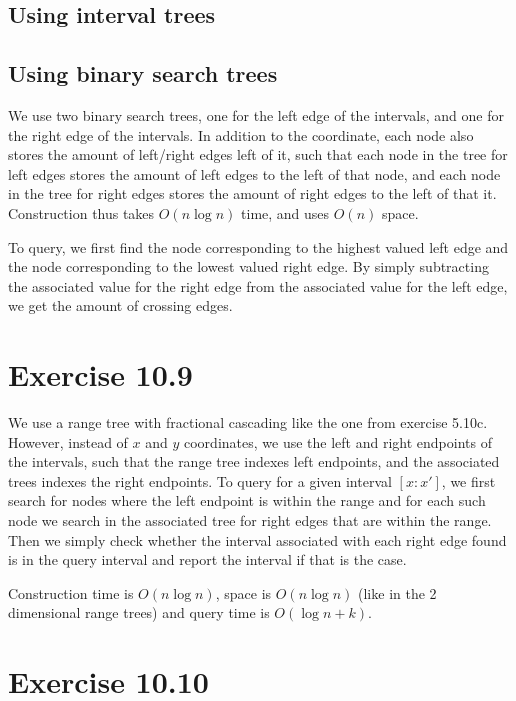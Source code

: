 \documentclass[11pt,a4paper]{article}
\begin{document}
\subsection{Using interval trees}


\subsection{Using binary search trees}

We use two binary search trees, one for the left edge of the
intervals, and one for the right edge of the intervals. In addition to
the coordinate, each node also stores the amount of left/right edges
left of it, such that each node in the tree for left edges stores the
amount of left edges to the left of that node, and each node in the
tree for right edges stores the amount of right edges to the left of
that it. Construction thus takes $O(n \log n)$ time, and uses $O(n)$
space.

To query, we first find the node corresponding to the highest valued
left edge and the node corresponding to the lowest valued right
edge. By simply subtracting the associated value for the right edge
from the associated value for the left edge, we get the amount of
crossing edges.

\section{Exercise 10.9}

We use a range tree with fractional cascading like the one from
exercise 5.10c. However, instead of $x$ and $y$ coordinates, we use
the left and right endpoints of the intervals, such that the range
tree indexes left endpoints, and the associated trees indexes the
right endpoints. To query for a given interval $[x:x']$, we first
search for nodes where the left endpoint is within the range and for
each such node we search in the associated tree for right edges that
are within the range. Then we simply check whether the interval
associated with each right edge found is in the query interval and
report the interval if that is the case.

Construction time is $O(n \log n)$, space is $O(n \log n)$ (like in
the 2 dimensional range trees) and query time is $O(\log n + k)$.

\section{Exercise 10.10}
\end{document}
